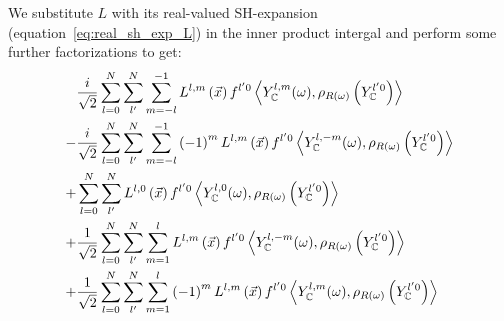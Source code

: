 \documentclass[10pt]{scrartcl}
\begin{document}
We substitute $L$ with its real-valued SH-expansion (equation~\ref{eq:real_sh_exp_L}) in the inner product intergal and perform some further factorizations to get:
\begin{align*}
&
\frac{i}{\sqrt{2}}
\sum_{l=0}^{N}{
\sum_{l'}^{N}{
\sum_{m=-l}^{-1}{
L^{{l,m}}\left (\vec{x} \right )
f^{l'0}
\left<
Y_{\mathbb{C}}^{l, m}(\omega )
, \rho_{R\left(\omega\right)}
\left(
Y_{\mathbb{C}}^{l'0}
\right)
\right>
}
}
}
\\
-
&
\frac{i}{\sqrt{2}}
\sum_{l=0}^{N}{
\sum_{l'}^{N}{
\sum_{m=-l}^{-1}{
\left({-1}\right)^{m}
L^{{l,m}}\left (\vec{x} \right )
f^{l'0}
\left<
Y_{\mathbb{C}}^{l, -m}(\omega )
, \rho_{R\left(\omega\right)}
\left(
Y_{\mathbb{C}}^{l'0}
\right)
\right>
}
}
}
\\
+
&
\sum_{l=0}^{N}{
\sum_{l'}^{N}{
L^{{l,0}}\left (\vec{x} \right )
f^{l'0}
\left<
Y_{\mathbb{C}}^{l, 0}(\omega )
, \rho_{R\left(\omega\right)}
\left(
Y_{\mathbb{C}}^{l'0}
\right)
\right>
}
}
\\
+
&
\frac{1}{\sqrt{2}}
\sum_{l=0}^{N}{
\sum_{l'}^{N}{
\sum_{m=1}^{l}{
L^{{l,m}}\left (\vec{x} \right )
f^{l'0}
\left<
Y_{\mathbb{C}}^{l, -m}(\omega )
, \rho_{R\left(\omega\right)}
\left(
Y_{\mathbb{C}}^{l'0}
\right)
\right>
}
}
}
\\
+
&
\frac{1}{\sqrt{2}}
\sum_{l=0}^{N}{
\sum_{l'}^{N}{
\sum_{m=1}^{l}{
\left({-1}\right)^{m}
L^{{l,m}}\left (\vec{x} \right )
f^{l'0}
\left<
Y_{\mathbb{C}}^{l, m}(\omega )
, \rho_{R\left(\omega\right)}
\left(
Y_{\mathbb{C}}^{l'0}
\right)
\right>
}
}
}
\end{align*}
\end{document}
